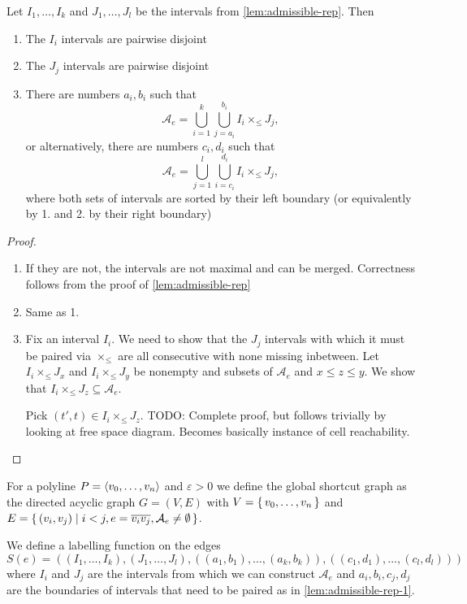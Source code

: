 \begin{lemma}\label{lem:admissible-rep-1}
	Let \(I_1, \dots, I_k\) and \(J_1, \dots, J_l\) be the intervals from \cref{lem:admissible-rep}. Then 
	\begin{enumerate}
		\item The \(I_i\) intervals are pairwise disjoint 
		\item The \(J_j\) intervals are pairwise disjoint 
		\item There are numbers \(a_i, b_i\) such that 
			\[\mathcal{A}_e = \bigcup_{i=1}^k \bigcup_{j=a_i}^{b_i} I_i \times_\leq J_j,\]	
			or alternatively, there are numbers \(c_i, d_i\) such that 
			\[\mathcal{A}_e = \bigcup_{j=1}^l \bigcup_{i=c_i}^{d_i} I_i \times_\leq J_j,\]	
		where both sets of intervals are sorted by their left boundary (or equivalently by 1. and 2. by their right boundary)
	\end{enumerate}
\end{lemma}

\begin{proof}
  \begin{enumerate}
		\item If they are not, the intervals are not maximal and can be merged. Correctness follows from the proof of \cref{lem:admissible-rep}
		\item Same as 1.
		\item Fix an interval \(I_i\). We need to show that the \(J_j\) intervals with which it must be paired via \(\times_\leq\) are all consecutive with none missing inbetween. Let \(I_i \times_\leq J_x\) and \(I_i \times_\leq J_y\) be nonempty and subsets of \(\mathcal{A}_e\) and \(x \leq z \leq y\). We show that \(I_i \times_\leq J_z \subseteq \mathcal{A}_e\).

			Pick \((t', t) \in I_i \times_\leq J_z\). TODO: Complete proof, but follows trivially by looking at free space diagram. Becomes basically instance of cell reachability.
  \end{enumerate}
\end{proof}

\begin{definition}
	For a polyline \(P = \left\langle v_0, \dots, v_n\right\rangle\) and \(\varepsilon > 0\) we define the global shortcut graph as the directed acyclic graph \(G = (V, E)\) with \(V = \set{v_0, \dots, v_n}\) and \(E = \set{(v_i, v_j) \mid i < j, e = \overline{v_iv_j}, \mathcal{A}_e \neq \emptyset}\).

	We define a labelling function on the edges 
	\[S(e) = ((I_1, \dots, I_k), (J_1, \dots, J_l), ((a_1, b_1), \dots, (a_k, b_k)), ((c_1, d_1), \dots, (c_l, d_l)))\] 
	where \(I_i\) and \(J_j\) are the intervals from which we can construct \(\mathcal{A}_e\) and \(a_i, b_i, c_j, d_j\) are the boundaries of intervals that need to be paired as in \cref{lem:admissible-rep-1}.
\end{definition}

